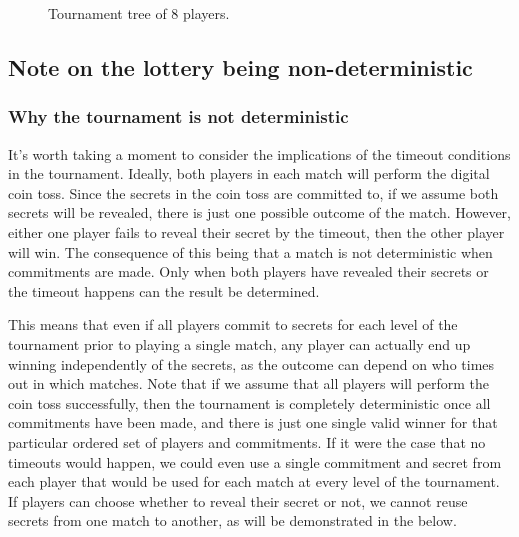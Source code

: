 \begin{figure}[htbp]
  \centering
  
  \caption{Tournament tree of 8 players.}
  \label{fig:tournament-tree}
\end{figure}

\subsection{Note on the lottery being non-deterministic}

\subsubsection{Why the tournament is not deterministic}  %
It's worth taking a moment to consider the implications of the timeout conditions in the tournament. Ideally, both players in each match will perform the digital coin toss. Since the secrets in the coin toss are committed to, if we assume both secrets will be revealed, there is just one possible outcome of the match. However, either one player fails to reveal their secret by the timeout, then the other player will win. The consequence of this being that a match is not deterministic when commitments are made. Only when both players have revealed their secrets or the timeout happens can the result be determined. 

This means that even if all players commit to secrets for each level of the tournament prior to playing a single match, any player can actually end up winning independently of the secrets, as the outcome can depend on who times out in which matches. Note that if we assume that all players will perform the coin toss successfully, then the tournament is completely deterministic once all commitments have been made, and there is just one single valid winner for that particular ordered set of players and commitments. If it were the case that no timeouts would happen, we could even use a single commitment and secret from each player that would be used for each match at every level of the tournament. If players can choose whether to reveal their secret or not, we cannot reuse secrets from one match to another, as will be demonstrated in the below.

